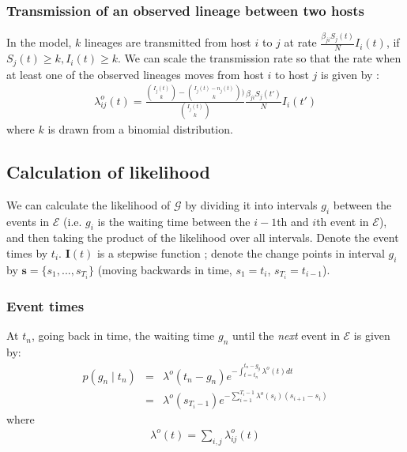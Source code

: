 \documentclass[]{report}
\begin{document}
\subsubsection{Transmission of an observed lineage between two hosts}
In the model, $k$ lineages are transmitted from host $i$ to $j$ at rate $\frac{\beta_{ji}S_j(t)}{N}I_i(t)$, if $S_j(t) \geq k, I_i(t) \geq k$. We can scale the transmission rate so that the rate when at least one of the observed lineages moves from host $i$ to host $j$ is given by : 
\begin{eqnarray}
\lambda_{ij}^o(t) =  \frac{{I_j(t) \choose k} - {I_j(t)  - n_j(t) \choose k}  )}{{I_j(t) \choose k}}  \frac{\beta_{ji} S_j(t')}{N}I_i(t')
\end{eqnarray}
where $k$ is drawn from a binomial distribution.
\subsection{Calculation of likelihood}
We can calculate the likelihood of $\mathcal{G}$ by dividing it into intervals $g_i$ between the events in $\mathcal{E} $ (i.e. $g_i$ is the waiting time between the $i-1$th and $i$th event in $\mathcal{E}$), and then taking the product of the likelihood over all intervals. Denote the event times by $t_i$. $\mathbf{I}(t)$ is a stepwise function ; denote the change points in interval $g_i$ by  $\mathbf{s} = \{s_1, ... , s_{T_i}\}$ (moving backwards in time, $s_1=t_i$, $s_{T_i}=t_{i-1}$).
\subsubsection{Event times}
At $t_n$, going back in time, the waiting time $g_n$ until the {\it next} event in $\mathcal{E}$ is given by:
\begin{eqnarray}
p(g_n \mid t_n) &=& \lambda^o(t_n - g_n) e^{-\int_{t=t_n}^{t_n - g_g} \lambda^o(t)dt} \nonumber\\
&=& \lambda^o(s_{T_i-1}) e^{-\sum_{i=1}^{T_i-1} \lambda^o(s_i)(s_{i+1} - s_i)}
\end{eqnarray}
where 
\begin{eqnarray}
\lambda^o(t) = \sum_{i,j}\lambda_{ij}^o(t)
\end{eqnarray}
\end{document}
